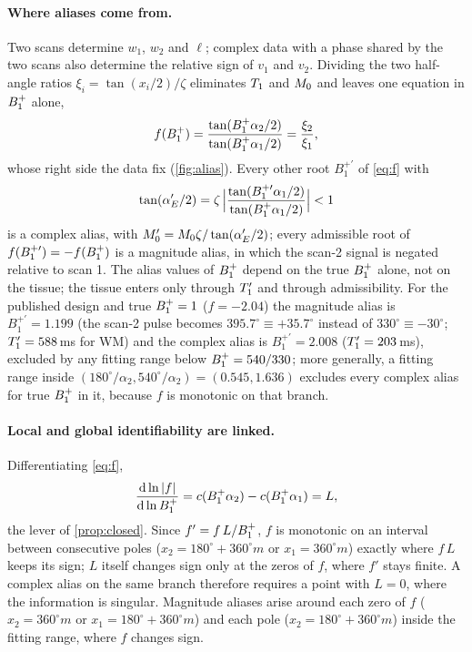 \paragraph{Where aliases come from.} Two scans determine $w_1$, $w_2$ and $\ell$; complex data with a
phase shared by the two scans also determine the relative sign of $v_1$ and $v_2$. Dividing the two
half-angle ratios $\xi_i=\tan(x_i/2)/\zeta$ eliminates $T_1$ and $M_0$ and leaves one equation in $B_1^{+}$ alone,
\begin{equation}
  f(B_1^{+})=\frac{\tan(B_1^{+}\alpha_2/2)}{\tan(B_1^{+}\alpha_1/2)}=\frac{\xi_2}{\xi_1},
  \label{eq:f}
\end{equation}
whose right side the data fix (\cref{fig:alias}). Every other root $B_1^{+\prime}$ of \eqref{eq:f} with
\[
  \tan(\alpha_E'/2)=\zeta\,\Bigl|\frac{\tan(B_1^{+\prime}\alpha_1/2)}{\tan(B_1^{+}\alpha_1/2)}\Bigr|<1
\]
is a complex alias, with $M_0'=M_0\zeta/\tan(\alpha_E'/2)$; every admissible root of $f(B_1^{+\prime})=-f(B_1^{+})$ is a
magnitude alias, in which the scan-2 signal is negated relative to scan 1. The alias values
of $B_1^{+}$ depend on the true $B_1^{+}$ alone, not on the tissue; the tissue enters only through $T_1'$ and
through admissibility. For the published design and true $B_1^{+}=1$ ($f=-2.04$) the magnitude alias
is $B_1^{+\prime}=1.199$ (the scan-2 pulse becomes $395.7^\circ\equiv+35.7^\circ$ instead of $330^\circ\equiv-30^\circ$; $T_1'=588$\,ms
for WM) and the complex alias is $B_1^{+\prime}=2.008$ ($T_1'=203$\,ms), excluded by any fitting range below
$B_1^{+}=540/330$; more generally, a fitting range inside $(180^\circ/\alpha_2,540^\circ/\alpha_2)=(0.545,1.636)$
excludes every complex alias for true $B_1^{+}$ in it, because $f$ is monotonic on that branch.

\paragraph{Local and global identifiability are linked.} Differentiating \eqref{eq:f},
\begin{equation}
  \frac{\mathrm d\ln|f|}{\mathrm d\ln B_1^{+}}=c(B_1^{+}\alpha_2)-c(B_1^{+}\alpha_1)=L ,
  \label{eq:dlnf}
\end{equation}
the lever of \cref{prop:closed}. Since $f'=f\,L/B_1^{+}$, $f$ is monotonic on an interval between consecutive
poles ($x_2=180^\circ+360^\circ m$ or $x_1=360^\circ m$) exactly where $f\,L$ keeps its sign; $L$ itself changes sign only
at the zeros of $f$, where $f'$ stays finite. A complex alias on the same branch therefore requires a
point with $L=0$, where the information is singular. Magnitude aliases arise around each zero of $f$ ($x_2=360^\circ m$ or $x_1=180^\circ+360^\circ m$) and each
pole ($x_2=180^\circ+360^\circ m$) inside the fitting range, where $f$ changes sign.

